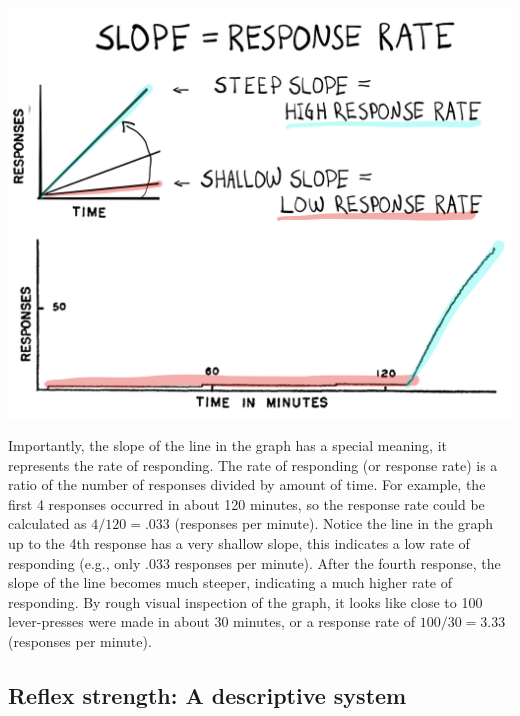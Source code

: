 \documentclass[
  oneside,
  12pt]{crumpbook}
\newenvironment{floatright50}{%
  \wrapfigure{R}{.5\textwidth}%
  }{%
  \endwrapfigure}
\begin{document}
\begin{floatright50}
\includegraphics[width=1\linewidth]{imgs/Skinner_Slope}

\end{floatright50}

Importantly, the slope of the line in the graph has a special meaning, it represents the rate of responding. The rate of responding (or response rate) is a ratio of the number of responses divided by amount of time. For example, the first 4 responses occurred in about 120 minutes, so the response rate could be calculated as \(4/120 = .033\) (responses per minute). Notice the line in the graph up to the 4th response has a very shallow slope, this indicates a low rate of responding (e.g., only .033 responses per minute). After the fourth response, the slope of the line becomes much steeper, indicating a much higher rate of responding. By rough visual inspection of the graph, it looks like close to 100 lever-presses were made in about 30 minutes, or a response rate of \(100/30 = 3.33\) (responses per minute).

\hypertarget{reflex-strength-a-descriptive-system}{%
\subsection{Reflex strength: A descriptive system}\label{reflex-strength-a-descriptive-system}}
\end{document}
